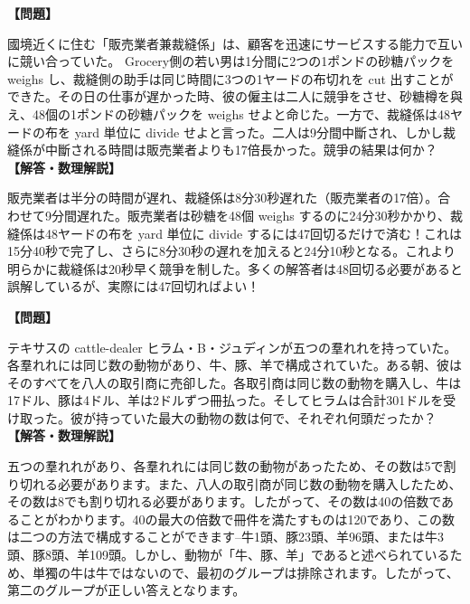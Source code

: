 \documentclass[10pt,a4paper,oneside,openany]{ltjsbook}
\begin{document}
\begin{tcolorbox}[colback=softblue,colframe=primaryblue,title=\textbf{第 34 問：販売業者と裁縫係の競爭 （原題: THE GROCER AND DRAPER.）},arc=2mm,boxrule=1pt,breakable]
\textbf{【問題】}\par\vspace{0.3em}
國境近くに住む「販売業者兼裁縫係」は、顧客を迅速にサービスする能力で互いに競い合っていた。 Grocery側の若い男は1分間に2つの1ポンドの砂糖パックを weighs し、裁縫側の助手は同じ時間に3つの1ヤードの布切れを cut 出すことができた。その日の仕事が遅かった時、彼の僱主は二人に競爭をさせ、砂糖樽を與え、48個の1ポンドの砂糖パックを weighs せよと命じた。一方で、裁縫係は48ヤードの布を yard 単位に divide せよと言った。二人は9分間中斷され、しかし裁縫係が中斷される時間は販売業者よりも17倍長かった。競爭の結果は何か？
\tcblower
\textbf{【解答・数理解説】}\par\vspace{0.3em}
販売業者は半分の時間が遅れ、裁縫係は8分30秒遅れた（販売業者の17倍）。合わせて9分間遅れた。販売業者は砂糖を48個 weighs するのに24分30秒かかり、裁縫係は48ヤードの布を yard 単位に divide するには47回切るだけで済む！これは15分40秒で完了し、さらに8分30秒の遅れを加えると24分10秒となる。これより明らかに裁縫係は20秒早く競爭を制した。多くの解答者は48回切る必要があると誤解しているが、実際には47回切ればよい！
\end{tcolorbox}

\begin{tcolorbox}[colback=softblue,colframe=primaryblue,title=\textbf{第 35 問：ジュディンズの牛 （原題: JUDKINS'S CATTLE.）},arc=2mm,boxrule=1pt,breakable]
\textbf{【問題】}\par\vspace{0.3em}
テキサスの cattle-dealer ヒラム・B・ジュディンが五つの羣れれを持っていた。各羣れれには同じ数の動物があり、牛、豚、羊で構成されていた。ある朝、彼はそのすべてを八人の取引商に売卻した。各取引商は同じ数の動物を購入し、牛は17ドル、豚は4ドル、羊は2ドルずつ冊払った。そしてヒラムは合計301ドルを受け取った。彼が持っていた最大の動物の数は何で、それぞれ何頭だったか？
\tcblower
\textbf{【解答・数理解説】}\par\vspace{0.3em}
五つの羣れれがあり、各羣れれには同じ数の動物があったため、その数は5で割り切れる必要があります。また、八人の取引商が同じ数の動物を購入したため、その数は8でも割り切れる必要があります。したがって、その数は40の倍数であることがわかります。40の最大の倍数で冊件を満たすものは120であり、この数は二つの方法で構成することができます--牛1頭、豚23頭、羊96頭、または牛3頭、豚8頭、羊109頭。しかし、動物が「牛、豚、羊」であると述べられているため、単獨の牛は牛ではないので、最初のグループは排除されます。したがって、第二のグループが正しい答えとなります。
\end{tcolorbox}
\end{document}
